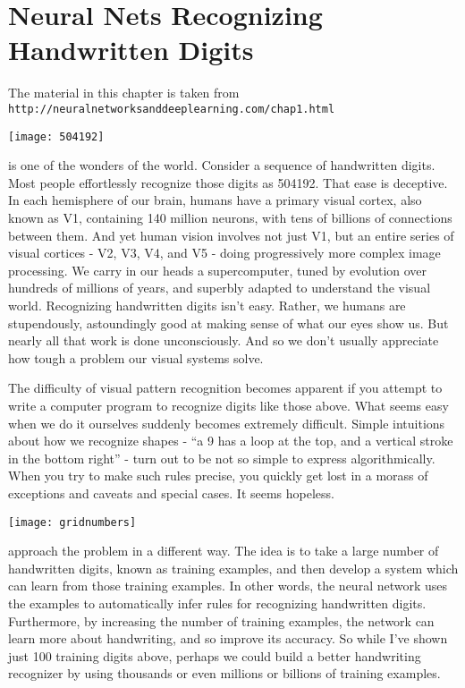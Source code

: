 


\chapter{Neural Nets Recognizing Handwritten Digits}
\label{sec:UsingNeuralNetsTorRcognizeHandWrittenDigits}

The material in this chapter is taken from\\
\lstinline{http://neuralnetworksanddeeplearning.com/chap1.html}

\begin{marginfigure}
\texttt{[image: 504192]}
\end{marginfigure}

 is one of the wonders of the world. Consider a sequence of handwritten digits. 
Most people effortlessly recognize those digits as 504192. That ease is deceptive. In each hemisphere of our brain, humans have a primary visual cortex, also known as V1, containing 140 million neurons, with tens of billions of connections between them. And yet human vision involves not just V1, but an entire series of visual cortices - V2, V3, V4, and V5 - doing progressively more complex image processing. We carry in our heads a supercomputer, tuned by evolution over hundreds of millions of years, and superbly adapted to understand the visual world. Recognizing handwritten digits isn't easy. Rather, we humans are stupendously, astoundingly good at making sense of what our eyes show us. But nearly all that work is done unconsciously. And so we don't usually appreciate how tough a problem our visual systems solve.

The difficulty of visual pattern recognition becomes apparent if you attempt to write a computer program to recognize digits like those above. What seems easy when we do it ourselves suddenly becomes extremely difficult. Simple intuitions about how we recognize shapes - ``a 9 has a loop at the top, and a vertical stroke in the bottom right'' - turn out to be not so simple to express algorithmically. When you try to make such rules precise, you quickly get lost in a morass of exceptions and caveats and special cases. It seems hopeless.


\begin{marginfigure}
\texttt{[image: gridnumbers]}
\end{marginfigure}

 approach the problem in a different way. The idea is to take a large number of handwritten digits, known as training examples, and then develop a system which can learn from those training examples. In other words, the neural network uses the examples to automatically infer rules for recognizing handwritten digits. Furthermore, by increasing the number of training examples, the network can learn more about handwriting, and so improve its accuracy. So while I've shown just 100 training digits above, perhaps we could build a better handwriting recognizer by using thousands or even millions or billions of training examples.


